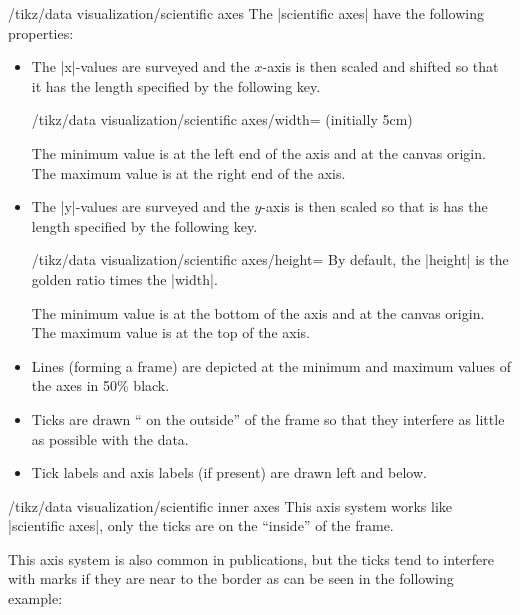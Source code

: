 \begin{key}{/tikz/data visualization/scientific axes}
  The |scientific axes| have the following properties:
  \begin{itemize}
  \item The |x|-values are surveyed and the $x$-axis is then scaled
    and shifted so  that it has the length specified by the following key.
    \begin{key}{/tikz/data visualization/scientific
        axes/width= (initially 5cm)}
    \end{key}
    The minimum value is at the left end of the axis and at the canvas
    origin. The maximum value is at the right end of the axis.
  \item The |y|-values are surveyed and the $y$-axis is then scaled so
    that is has the length specified by the following key.
    \begin{key}{/tikz/data visualization/scientific
        axes/height=}
      By default, the |height| is the golden ratio times the |width|.
    \end{key}
    The minimum value is at the bottom of the axis and at the canvas
    origin. The maximum value is at the top of the axis.
  \item Lines (forming a frame) are depicted at the minimum and
    maximum values of the axes in 50\% black.
  \item Ticks are drawn `` on the outside'' of the frame so that they
    interfere as little as possible with the data.
  \item Tick labels and axis labels (if present) are drawn left and
    below.
  \end{itemize}
\end{key}

\begin{key}{/tikz/data visualization/scientific inner axes}
  This axis system works like |scientific axes|, only the ticks are on
  the ``inside'' of the frame.

\begin{codeexample}[]
\end{codeexample}

  This axis system is also common in publications, but the ticks tend
  to interfere with marks if they are near to the border as can be
  seen in the following example:
\begin{codeexample}[]
\end{codeexample}

\end{key}

